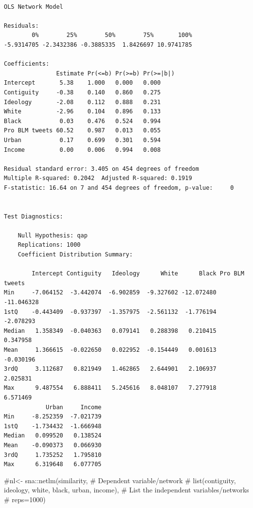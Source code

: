 \documentclass[
  letterpaper,
  DIV=11,
  numbers=noendperiod]{scrartcl}
\newenvironment{Shaded}{\begin{snugshade}}{\end{snugshade}}
\newcommand{\CommentTok}[1]{\textcolor[rgb]{0.37,0.37,0.37}{#1}}
\begin{document}
\begin{verbatim}

OLS Network Model

Residuals:
        0%        25%        50%        75%       100% 
-5.9314705 -2.3432386 -0.3885335  1.8426697 10.9741785 

Coefficients:
               Estimate Pr(<=b) Pr(>=b) Pr(>=|b|)
Intercept       5.38    1.000   0.000   0.000    
Contiguity     -0.38    0.140   0.860   0.275    
Ideology       -2.08    0.112   0.888   0.231    
White          -2.96    0.104   0.896   0.133    
Black           0.03    0.476   0.524   0.994    
Pro BLM tweets 60.52    0.987   0.013   0.055    
Urban           0.17    0.699   0.301   0.594    
Income          0.00    0.006   0.994   0.008    

Residual standard error: 3.405 on 454 degrees of freedom
Multiple R-squared: 0.2042  Adjusted R-squared: 0.1919 
F-statistic: 16.64 on 7 and 454 degrees of freedom, p-value:     0 


Test Diagnostics:

    Null Hypothesis: qap 
    Replications: 1000 
    Coefficient Distribution Summary:

        Intercept Contiguity   Ideology      White      Black Pro BLM tweets
Min     -7.064152  -3.442074  -6.902859  -9.327602 -12.072480     -11.046328
1stQ    -0.443409  -0.937397  -1.357975  -2.561132  -1.776194      -2.078293
Median   1.358349  -0.040363   0.079141   0.288398   0.210415       0.347958
Mean     1.366615  -0.022650   0.022952  -0.154449   0.001613      -0.030196
3rdQ     3.112687   0.821949   1.462865   2.644901   2.106937       2.025831
Max      9.487554   6.888411   5.245616   8.048107   7.277918       6.571469
            Urban     Income
Min     -8.252359  -7.021739
1stQ    -1.734432  -1.666948
Median   0.099520   0.138524
Mean    -0.090373   0.066930
3rdQ     1.735252   1.795810
Max      6.319648   6.077705
\end{verbatim}

\begin{Shaded}
\begin{Highlighting}[]
\CommentTok{\#nl\textless{}{-} sna::netlm(similarity,           \# Dependent variable/network}
\CommentTok{\#         list(contiguity, ideology, white, black, urban, income), \# List the independent variables/networks}
\CommentTok{\#          reps=1000) }
\end{Highlighting}
\end{Shaded}
\end{document}
